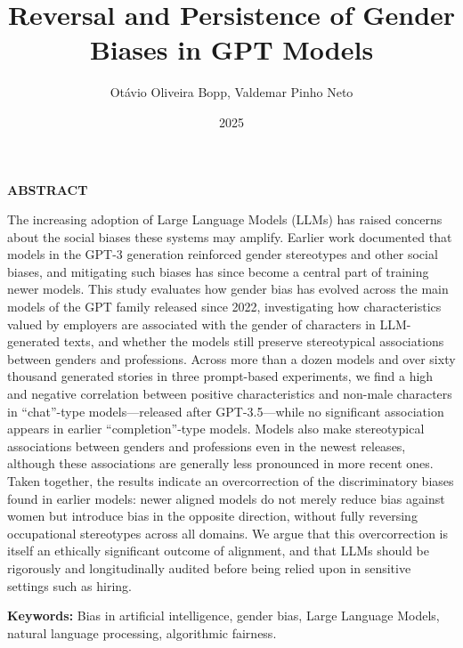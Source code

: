 \documentclass[12pt,a4paper]{article}
\title{Reversal and Persistence of Gender Biases in GPT Models}
\author{Otávio Oliveira Bopp, Valdemar Pinho Neto}
\date{2025}
\begin{document}
\maketitle


\noindent\textbf{ABSTRACT}

\medskip

\noindent The increasing adoption of Large Language Models (LLMs) has raised concerns about the social biases these systems may amplify. Earlier work documented that models in the GPT-3 generation reinforced gender stereotypes and other social biases, and mitigating such biases has since become a central part of training newer models. This study evaluates how gender bias has evolved across the main models of the GPT family released since 2022, investigating how characteristics valued by employers are associated with the gender of characters in LLM-generated texts, and whether the models still preserve stereotypical associations between genders and professions. Across more than a dozen models and over sixty thousand generated stories in three prompt-based experiments, we find a high and negative correlation between positive characteristics and non-male characters in ``chat''-type models---released after GPT-3.5---while no significant association appears in earlier ``completion''-type models. Models also make stereotypical associations between genders and professions even in the newest releases, although these associations are generally less pronounced in more recent ones. Taken together, the results indicate an overcorrection of the discriminatory biases found in earlier models: newer aligned models do not merely reduce bias against women but introduce bias in the opposite direction, without fully reversing occupational stereotypes across all domains. We argue that this overcorrection is itself an ethically significant outcome of alignment, and that LLMs should be rigorously and longitudinally audited before being relied upon in sensitive settings such as hiring.

\medskip

\noindent\textbf{Keywords:} Bias in artificial intelligence, gender bias, Large Language Models, natural language processing, algorithmic fairness.

\newpage
\tableofcontents
\newpage
\end{document}
